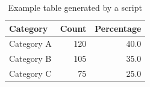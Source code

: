 \begin{table}[H]
\centering
\caption{Example table generated by a script}
\label{tab:example}
\begin{tabular}{lrr}
\toprule
Category & Count & Percentage \\
\midrule
Category A & 120 & 40.0 \\
Category B & 105 & 35.0 \\
Category C &  75 & 25.0 \\
\bottomrule
\end{tabular}
\end{table}
